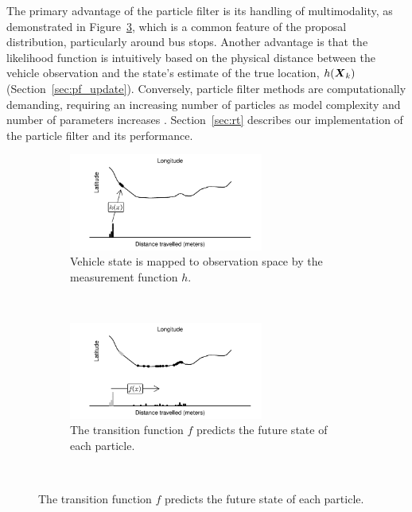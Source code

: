 The primary advantage of the particle filter is its handling of multimodality,
as demonstrated in Figure~\ref{fig:pf_state_predict},
which is a common feature of the proposal distribution, particularly around bus stops.
Another advantage is that the likelihood function is intuitively based
on the physical distance between the vehicle observation and the state's
estimate of the true location, $h(\mbox{$\boldsymbol{X}$}_k)$ (Section~\ref{sec:pf_update}).
Conversely, particle filter methods are computationally demanding,
requiring an increasing number of particles as model complexity and
number of parameters increases \citep{Carpenter_1999}.
Section~\ref{sec:rt} describes our implementation of the particle filter
and its \rt performance.

\begin{figure}[p]
    \centering
    \begin{subfigure}[t]{1\textwidth}
        \centering
        \includegraphics[width=0.7\textwidth]{figures/03_particle_filter_1.pdf}
        \caption{
            Vehicle state is mapped to observation space by the
            measurement function $h$.   
        }
        \label{fig:pf_state_prev}
    \end{subfigure}\\
    \begin{subfigure}[t]{0.9\textwidth}
        \centering
        \includegraphics[width=0.7\textwidth]{figures/03_particle_filter_2.pdf}
        \caption{
            The transition function $f$ predicts the future state 
            of each particle.
        }
        \label{fig:pf_state_predict}
    \end{subfigure}\\

\end{figure}
